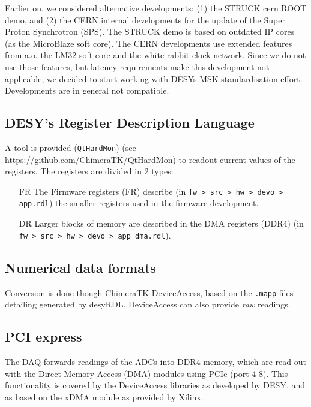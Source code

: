 \documentclass[12pt]{amsart}
\begin{document}
Earlier on, we considered alternative developments: 
(1) the STRUCK cern ROOT demo, and 
(2) the CERN internal developments for the update of the 
Super Proton Synchrotron (SPS). The STRUCK demo is based on outdated IP cores (as the  MicroBlaze soft core).
The CERN developments use extended features from a.o. the LM32 soft core and the white rabbit clock network.
Since we do not use those features, but latency requirements make this development not applicable, we decided to start working 
with DESYs MSK standardisation effort.
Developments are in general not compatible.


\subsection{DESY's Register Description Language}

A tool is provided (\verb|QtHardMon|) (see \url{https://github.com/ChimeraTK/QtHardMon}) 
to readout current values of the registers.
The registers are divided in 2 types:
\begin{itemize}
\item[FR] The Firmware registers (FR) describe (in \verb|fw > src > hw > devo > app.rdl|) the smaller registers used in the firmware development.

\item[DR] Larger blocks of memory are described in the DMA registers (DDR4) (in \verb|fw > src > hw > devo > app_dma.rdl|).
\end{itemize}



\subsection{Numerical data formats}

Conversion is done though ChimeraTK DeviceAccess, based on the \verb|.mapp| files detailing generated by desyRDL.
DeviceAccess can also provide {\em raw} readings. 

\subsection{PCI express}

The DAQ forwards readings of the ADCs into DDR4 memory, which are read out with the Direct Memory Access (DMA) 
modules using PCIe (port 4-8).
This functionality is covered by the DeviceAccess libraries as developed by DESY, and as based on the xDMA module as provided by Xilinx.
\end{document}
